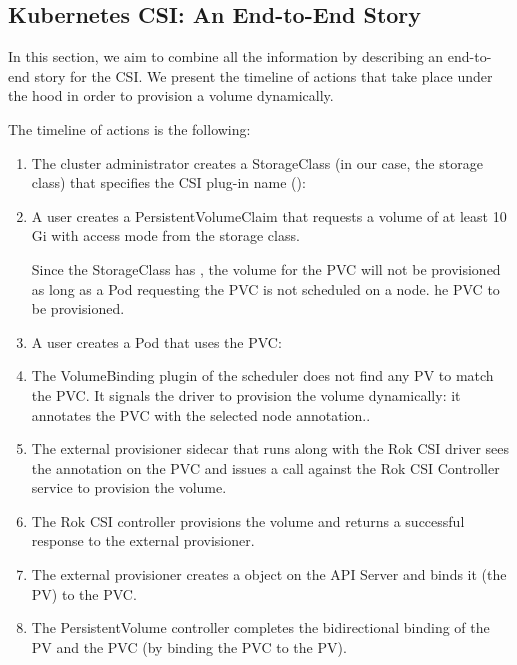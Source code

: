\subsection{Kubernetes CSI: An End-to-End Story}

In this section, we aim to combine all the information by describing an
end-to-end story for the CSI.  We present the timeline of actions that take
place under the hood in order to provision a  volume dynamically.

The timeline of actions is the following:

\begin{enumerate}
	\tightlist
	\item The cluster administrator creates a StorageClass (in our case, the
	       storage class) that specifies the CSI plug-in name
	      ():
	      

	\item A user creates a PersistentVolumeClaim that requests a volume of at
	      least 10 Gi with access mode  from the 
	      storage class.

	      

	      Since the  StorageClass has , the volume for the PVC will not be
	      provisioned as long as a Pod requesting the PVC is not scheduled
	      on a node. he PVC to be provisioned.
	\item  A user creates a Pod that uses the PVC:
	      
	\item The VolumeBinding plugin of the scheduler does not find any PV to
	      match the PVC. It signals the driver to provision the volume
	      dynamically: it annotates the PVC with the selected node annotation..
	\item The external provisioner sidecar that runs along with the Rok CSI
	      driver sees the annotation on the PVC and issues a 
	      call against the Rok CSI Controller service to provision the volume.
	\item The Rok CSI controller provisions the volume and returns a successful
	      response to the external provisioner.
	\item The external provisioner creates a  object on the API
	      Server and binds it (the PV) to the  PVC.
	\item The PersistentVolume controller completes the bidirectional binding of
	      the PV and the PVC (by binding the PVC to the PV).
\end{enumerate}